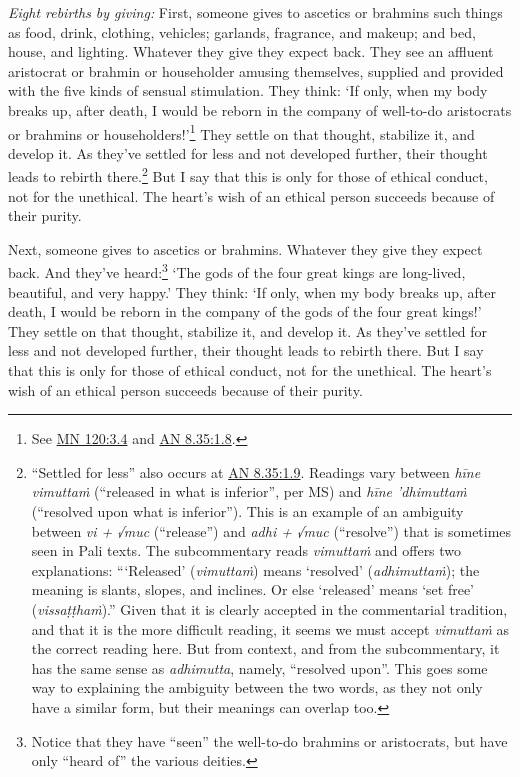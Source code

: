 \documentclass[12pt,openany]{book}%
\begin{document}
\emph{Eight rebirths by giving:} First, someone gives to ascetics or brahmins such things as food, drink, clothing, vehicles; garlands, fragrance, and makeup; and bed, house, and lighting. Whatever they give they expect back. They see an affluent aristocrat or brahmin or householder amusing themselves, supplied and provided with the five kinds of sensual stimulation. They think: ‘If only, when my body breaks up, after death, I would be reborn in the company of well-to-do aristocrats or brahmins or householders!’\footnote{See \href{https://suttacentral.net/mn120/en/sujato\#3.4}{MN 120:3.4} and \href{https://suttacentral.net/an8.35/en/sujato\#1.8}{AN 8.35:1.8}. } They settle on that thought, stabilize it, and develop it. As they’ve settled for less and not developed further, their thought leads to rebirth there.\footnote{“Settled for less” also occurs at \href{https://suttacentral.net/an8.35/en/sujato\#1.9}{AN 8.35:1.9}. Readings vary between \textit{\textsanskrit{hīne} \textsanskrit{vimuttaṁ}} (“released in what is inferior”, per MS) and \textit{\textsanskrit{hīne} ’\textsanskrit{dhimuttaṁ}} (“resolved upon what is inferior”). This is an example of an ambiguity between \textit{vi + √muc} (“release”) and \textit{adhi + √muc} (“resolve”) that is sometimes seen in Pali texts. The subcommentary reads \textit{\textsanskrit{vimuttaṁ}} and offers two explanations: “‘Released’ (\textit{\textsanskrit{vimuttaṁ}}) means ‘resolved’ (\textit{\textsanskrit{adhimuttaṁ}}); the meaning is slants, slopes, and inclines. Or else ‘released’ means ‘set free’ (\textit{\textsanskrit{vissaṭṭhaṁ}}).” Given that it is clearly accepted in the commentarial tradition, and that it is the more difficult reading, it seems we must accept \textit{\textsanskrit{vimuttaṁ}} as the correct reading here. But from context, and from the subcommentary, it has the same sense as \textit{adhimutta}, namely, “resolved upon”. This goes some way to explaining the ambiguity between the two words, as they not only have a similar form, but their meanings can overlap too. } But I say that this is only for those of ethical conduct, not for the unethical. The heart’s wish of an ethical person succeeds because of their purity. 

Next, someone gives to ascetics or brahmins. Whatever they give they expect back. And they’ve heard:\footnote{Notice that they have “seen” the well-to-do brahmins or aristocrats, but have only “heard of” the various deities. } ‘The gods of the four great kings are long-lived, beautiful, and very happy.’ They think: ‘If only, when my body breaks up, after death, I would be reborn in the company of the gods of the four great kings!’ They settle on that thought, stabilize it, and develop it. As they’ve settled for less and not developed further, their thought leads to rebirth there. But I say that this is only for those of ethical conduct, not for the unethical. The heart’s wish of an ethical person succeeds because of their purity. 
\end{document}
